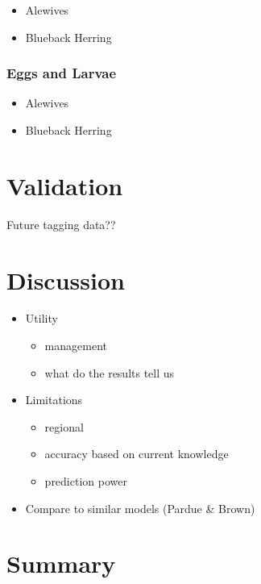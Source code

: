 \documentclass[
]{book}
\providecommand{\tightlist}{%
  \setlength{\itemsep}{0pt}\setlength{\parskip}{0pt}}
\begin{document}
\begin{itemize}
\tightlist
\item
  Alewives
\item
  Blueback Herring
\end{itemize}

\hypertarget{eggs-and-larvae-1}{%
\subsection{Eggs and Larvae}\label{eggs-and-larvae-1}}

\begin{itemize}
\tightlist
\item
  Alewives
\item
  Blueback Herring
\end{itemize}

\hypertarget{validation}{%
\chapter{Validation}\label{validation}}

Future tagging data??

\hypertarget{discussion}{%
\chapter{Discussion}\label{discussion}}

\begin{itemize}
\tightlist
\item
  Utility

  \begin{itemize}
  \tightlist
  \item
    management
  \item
    what do the results tell us
  \end{itemize}
\item
  Limitations

  \begin{itemize}
  \tightlist
  \item
    regional
  \item
    accuracy based on current knowledge
  \item
    prediction power
  \end{itemize}
\item
  Compare to similar models (Pardue \& Brown)
\end{itemize}

\hypertarget{summary}{%
\chapter{Summary}\label{summary}}
\end{document}

